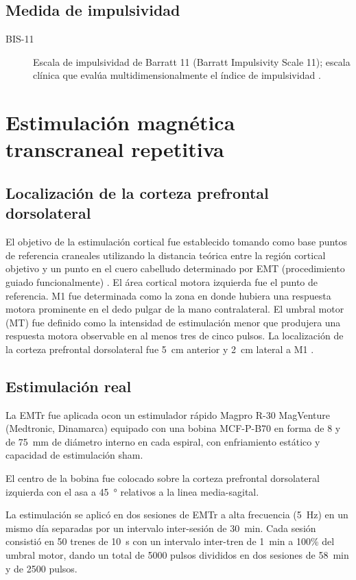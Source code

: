 \subsection{Medida de impulsividad}
\begin{description}
    \item[BIS-11] Escala de impulsividad de Barratt 11 (Barratt Impulsivity Scale 11); escala clínica que evalúa multidimensionalmente el índice de impulsividad \parencite{H.Patton1995,Salvo2013}.
\end{description}

\section{Estimulación magnética transcraneal repetitiva}
\subsection{Localización de la corteza prefrontal dorsolateral}
El objetivo de la estimulación cortical fue establecido tomando como base puntos de referencia craneales utilizando la distancia teórica entre la región cortical objetivo y un punto en el cuero cabelludo determinado por EMT (procedimiento guiado funcionalmente) \parencite{Sparing2008}.
El área cortical motora izquierda fue el punto de referencia.
M1 fue determinada como la zona en donde hubiera una respuesta motora prominente en el dedo pulgar de la mano contralateral.
El umbral motor (MT) fue definido como la intensidad de estimulación menor que produjera una respuesta motora observable en al menos tres de cinco pulsos.
La localización de la corteza prefrontal dorsolateral fue \SI{5}{\centi\meter} anterior y \SI{2}{\centi\meter} lateral a M1 \parencite{Herwig2001a,Varnava2011a}.

\subsection{Estimulación real}
La EMTr fue aplicada ocon un estimulador rápido Magpro R-30 MagVenture (Medtronic, Dinamarca) equipado con una bobina MCF-P-B70 en forma de 8 y de \SI{75}{\milli\meter} de diámetro interno en cada espiral, con enfriamiento estático y capacidad de estimulación sham. \par
El centro de la bobina fue colocado sobre la corteza prefrontal dorsolateral izquierda con el asa a \SI{45}{\degree} relativos a la linea media-sagital. \par
La estimulación se aplicó en dos sesiones de EMTr a alta frecuencia (\SI{5}{\hertz}) en un mismo día separadas por un intervalo inter-sesión de \SI{30}{\minute}.
Cada sesión consistió en 50 trenes de \SI{10}{\second} con un intervalo inter-tren de \SI{1}{\minute} a 100\% del umbral motor, dando un total de 5000 pulsos divididos en dos sesiones de \SI{58}{\minute} y de 2500 pulsos.

